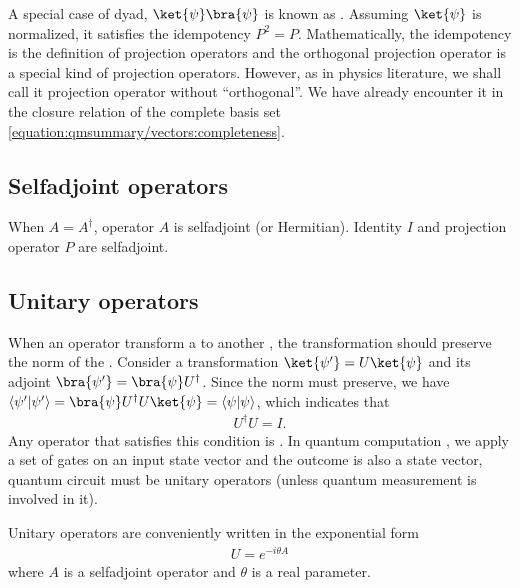 \documentclass[letterpaper,10pt,english]{jupyterBook}
\begin{document}
\sphinxAtStartPar
A special case of dyad, \(\ket{\psi}\bra{\psi}\) is known as .  Assuming \(\ket{\psi}\) is normalized, it satisfies the idempotency \(P^2=P\). Mathematically, the idempotency is the definition of projection operators and the orthogonal projection operator is a special kind of projection operators. However, as in physics literature, we shall call it projection operator without “orthogonal”.  We have already encounter it in the closure relation of the complete basis set \eqref{equation:qmsummary/vectors:completeness}.


\subsection{Self\sphinxhyphen{}adjoint operators}
\label{\detokenize{qmsummary/operators:self-adjoint-operators}}
\sphinxAtStartPar
When \(A = A^\dagger\), operator \(A\) is self\sphinxhyphen{}adjoint (or Hermitian).  Identity \(I\) and projection operator \(P\) are self\sphinxhyphen{}adjoint.


\subsection{Unitary operators}
\label{\detokenize{qmsummary/operators:unitary-operators}}
\sphinxAtStartPar
When an operator transform a  to another , the transformation should preserve the norm of the .  Consider a transformation \(\ket{\psi'} = U \ket{\psi}\) and its adjoint \(\bra{\psi'} = \bra{\psi} U^\dagger\).  Since the norm must preserve, we have
\(\langle \psi'|\psi' \rangle = \bra{\psi} U^\dagger U \ket{\psi} = \langle \psi|\psi \rangle\), which indicates that
\begin{equation*}
\begin{split}
U^\dagger U = I.
\end{split}
\end{equation*}
\sphinxAtStartPar
Any operator that satisfies this condition is . In quantum computation , we apply a set of gates on an input state vector and the outcome is also a state vector, quantum circuit must be unitary operators (unless quantum measurement is involved in it).

\sphinxAtStartPar
Unitary operators are conveniently written in the exponential form
\begin{equation*}
\begin{split}
U = e^{-i \theta A}
\end{split}
\end{equation*}
\sphinxAtStartPar
where \(A\) is a self\sphinxhyphen{}adjoint operator and \(\theta\) is a real parameter.
\end{document}
